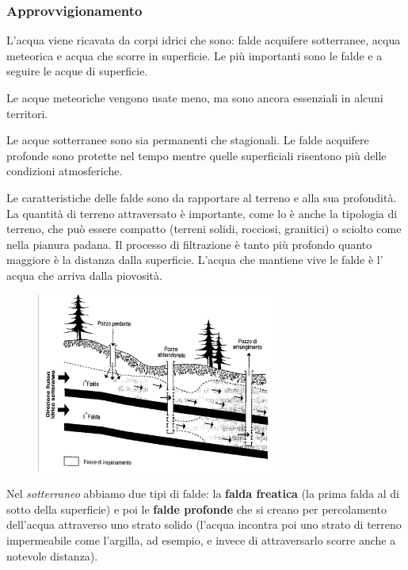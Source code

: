 \subsubsection{Approvvigionamento}

L'acqua viene ricavata da corpi idrici che sono: falde acquifere
sotterranee, acqua meteorica e acqua che scorre in superficie. Le più
importanti sono le falde e a seguire le acque di superficie.

Le acque meteoriche vengono usate meno, ma sono ancora essenziali in
alcuni territori.

Le acque sotterranee sono sia permanenti che stagionali. Le falde
acquifere profonde sono protette nel tempo mentre quelle superficiali
risentono più delle condizioni atmosferiche.

Le caratteristiche delle falde sono da rapportare al terreno e alla sua
profondità. La quantità di terreno attraversato è importante, come lo è
anche la tipologia di terreno, che può essere compatto (terreni solidi,
rocciosi, granitici) o sciolto come nella pianura padana. Il processo di
filtrazione è tanto più profondo quanto maggiore è la distanza dalla
superficie. L'acqua che mantiene vive le falde è l' acqua che arriva
dalla piovosità.

\begin{figure}[!ht]
\centering
	\includegraphics[width=0.7\textwidth]{24/image1.jpeg}
	\end{figure}

Nel \emph{sotterraneo} abbiamo due tipi di falde: la \textbf{falda
freatica} (la prima falda al di sotto della superficie) e poi le
\textbf{falde profonde} che si creano per percolamento dell'acqua
attraverso uno strato solido (l'acqua incontra poi uno strato di terreno
impermeabile come l'argilla, ad esempio, e invece di attraversarlo
scorre anche a notevole distanza).

